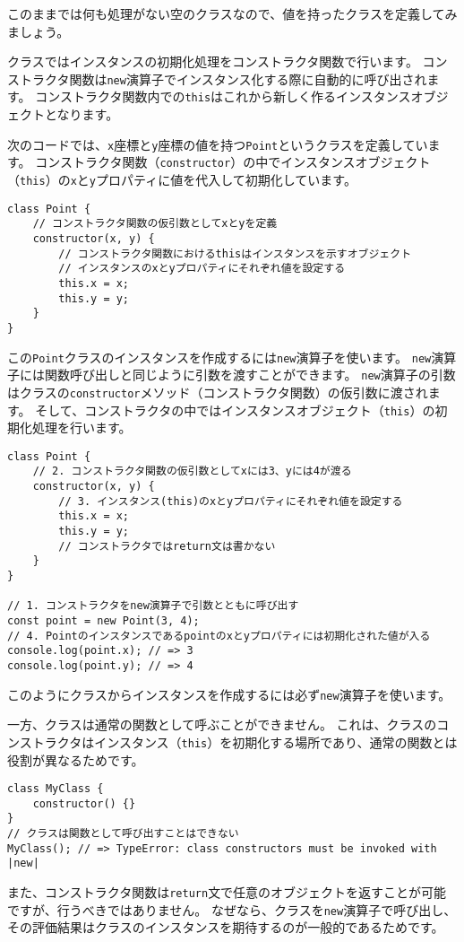 このままでは何も処理がない空のクラスなので、値を持ったクラスを定義してみましょう。

クラスではインスタンスの初期化処理をコンストラクタ関数で行います。
コンストラクタ関数は\texttt{new}演算子でインスタンス化する際に自動的に呼び出されます。
コンストラクタ関数内での\texttt{this}はこれから新しく作るインスタンスオブジェクトとなります。

次のコードでは、\texttt{x}座標と\texttt{y}座標の値を持つ\texttt{Point}というクラスを定義しています。
コンストラクタ関数（\texttt{constructor}）の中でインスタンスオブジェクト（\texttt{this}）の\texttt{x}と\texttt{y}プロパティに値を代入して初期化しています。

\begin{lstlisting}
class Point {
    // コンストラクタ関数の仮引数としてxとyを定義
    constructor(x, y) {
        // コンストラクタ関数におけるthisはインスタンスを示すオブジェクト
        // インスタンスのxとyプロパティにそれぞれ値を設定する
        this.x = x;
        this.y = y;
    }
}
\end{lstlisting}

この\texttt{Point}クラスのインスタンスを作成するには\texttt{new}演算子を使います。
\texttt{new}演算子には関数呼び出しと同じように引数を渡すことができます。
\texttt{new}演算子の引数はクラスの\texttt{constructor}メソッド（コンストラクタ関数）の仮引数に渡されます。
そして、コンストラクタの中ではインスタンスオブジェクト（\texttt{this}）の初期化処理を行います。

\begin{lstlisting}
class Point {
    // 2. コンストラクタ関数の仮引数としてxには3、yには4が渡る
    constructor(x, y) {
        // 3. インスタンス(this)のxとyプロパティにそれぞれ値を設定する
        this.x = x;
        this.y = y;
        // コンストラクタではreturn文は書かない
    }
}

// 1. コンストラクタをnew演算子で引数とともに呼び出す
const point = new Point(3, 4);
// 4. Pointのインスタンスであるpointのxとyプロパティには初期化された値が入る
console.log(point.x); // => 3
console.log(point.y); // => 4
\end{lstlisting}
\vspace{-1mm}
このようにクラスからインスタンスを作成するには必ず\texttt{new}演算子を使います。

一方、クラスは通常の関数として呼ぶことができません。
これは、クラスのコンストラクタはインスタンス（\texttt{this}）を初期化する場所であり、通常の関数とは役割が異なるためです。
\vspace{-1mm}
\begin{lstlisting}
class MyClass {
    constructor() {}
}
// クラスは関数として呼び出すことはできない
MyClass(); // => TypeError: class constructors must be invoked with |new|
\end{lstlisting}
\vspace{-1mm}
また、コンストラクタ関数は\texttt{return}文で任意のオブジェクトを返すことが可能ですが、行うべきではありません。
なぜなら、クラスを\texttt{new}演算子で呼び出し、その評価結果はクラスのインスタンスを期待するのが一般的であるためです。

